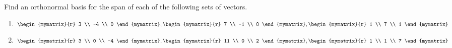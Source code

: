 \begin{enumialphparenastyle}

\begin{ex} Find an orthonormal basis for the span of each of the following sets of
vectors.

\begin{enumerate}
\item $\begin{mymatrix}{r}
 3 \\
-4 \\
0
\end{mymatrix} ,\begin{mymatrix}{r}
 7 \\
-1 \\
0
\end{mymatrix} ,\begin{mymatrix}{r}
 1 \\
7 \\
1
\end{mymatrix} $

\item $\begin{mymatrix}{r}
3 \\
0 \\
-4
\end{mymatrix} ,\begin{mymatrix}{r}
 11 \\
0 \\
2
\end{mymatrix} ,\begin{mymatrix}{r}
1 \\
1 \\
7
\end{mymatrix} $


\end{enumerate}
\end{ex}
\end{enumialphparenastyle}
